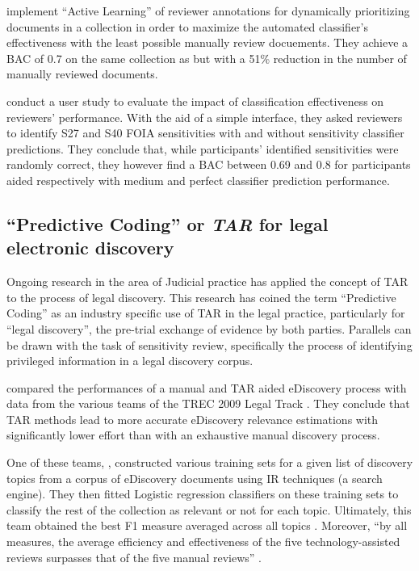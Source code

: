 \documentclass[\version]{l4proj}
\begin{document}
\textcite{mcdonaldActiveLearningStrategies2018} implement ``Active Learning'' of reviewer annotations for dynamically prioritizing documents in a collection in order to maximize the automated classifier's effectiveness with the least possible manually review docuements.
They achieve a BAC of 0.7 on the same collection as \textcite{mcdonaldStudySVMKernel2017,mcdonaldEnhancingSensitivityClassification2017} but with a 51\% reduction in the number of manually reviewed documents.

\textcite{mcdonaldHowSensitivityClassification2019} conduct a user study to evaluate the impact of classification effectiveness on reviewers' performance. With the aid of a simple interface, they asked reviewers to identify S27 and S40 FOIA sensitivities with and without sensitivity classifier predictions.
They conclude that, while participants' identified sensitivities were randomly correct, they however find a BAC between 0.69 and 0.8 for participants aided respectively with medium and perfect classifier prediction performance.

\subsection{``Predictive Coding'' or \textit{TAR} for legal electronic discovery}

Ongoing research in the area of Judicial practice has applied the concept of TAR to the process of legal discovery.
This research has coined the term ``Predictive Coding'' \autocite{carrollGrossmancormackGlossaryTechnologyassisted2013} as an industry specific use of TAR in the legal practice, particularly for ``legal discovery'', the pre-trial exchange of evidence by both parties.
Parallels can be drawn with the task of sensitivity review, specifically the process of identifying privileged information in a legal discovery corpus.

\textcite{grossmanTechnologyAssistedReviewEDiscovery2010} compared the performances of a manual and TAR aided eDiscovery process with data from the various teams of the TREC 2009 Legal Track \autocite{hedinOverviewTREC2009}.
They conclude that TAR methods lead to more accurate eDiscovery relevance estimations with significantly lower effort than with an exhaustive manual discovery process.

One of these teams, \textcite{cormackMachineLearningInformation2009}, constructed various training sets for a given list of discovery topics from a corpus of eDiscovery documents using IR techniques (a search engine).
They then fitted Logistic regression classifiers on these training sets to classify the rest of the collection as relevant or not for each topic.
Ultimately, this team obtained the best F1 measure averaged across all topics \autocite{hedinOverviewTREC2009}.
Moreover, ``by all measures, the average efficiency and effectiveness of the five technology-assisted reviews surpasses that of the five manual reviews'' \autocite[p.~43]{grossmanTechnologyAssistedReviewEDiscovery2010}.
\end{document}
